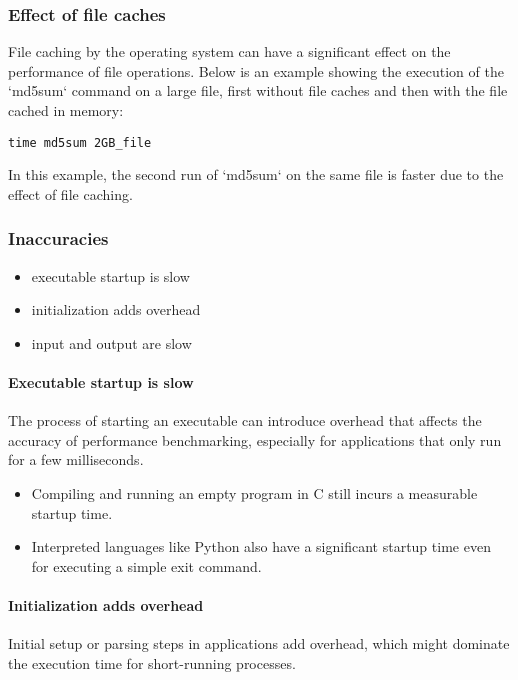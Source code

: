 \documentclass[12pt]{article}
\begin{document}
\subsubsection{Effect of file caches}
File caching by the operating system can have a significant effect on the performance of file operations. Below is an example showing the execution of the `md5sum` command on a large file, first without file caches and then with the file cached in memory:

\begin{verbatim}
time md5sum 2GB_file
\end{verbatim}

In this example, the second run of `md5sum` on the same file is faster due to the effect of file caching.

\subsubsection{Inaccuracies}
\begin{itemize}
    \item executable startup is slow
    \item initialization adds overhead
    \item input and output are slow
\end{itemize}

\paragraph{Executable startup is slow}
The process of starting an executable can introduce overhead that affects the accuracy of performance benchmarking, especially for applications that only run for a few milliseconds.

\begin{itemize}
    \item Compiling and running an empty program in C still incurs a measurable startup time.
    \item Interpreted languages like Python also have a significant startup time even for executing a simple exit command.
\end{itemize}


\paragraph{Initialization adds overhead}
Initial setup or parsing steps in applications add overhead, which might dominate the execution time for short-running processes.
\end{document}
